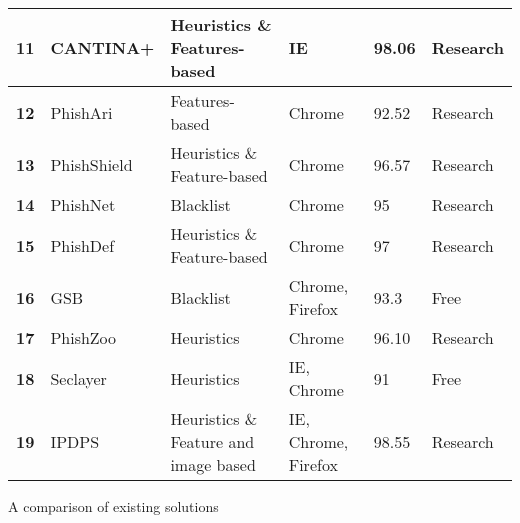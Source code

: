 \begin{center}
\begin{tabular}{ | m{0.9em} | m{7.6em} | m{13em} | m{7.1em} | m{2.3em} | m{4.3em} | }
		\hline
		\multicolumn{1}{|c|}{\textbf{11}} & CANTINA+                     & Heuristics \& Features-based          & IE                  & 98.06           & Research               \\
		\hline
		\multicolumn{1}{|c|}{\textbf{12}} & PhishAri                     & Features-based                        & Chrome              & 92.52           & Research               \\
		\hline
		\multicolumn{1}{|c|}{\textbf{13}} & PhishShield                  & Heuristics \& Feature-based           & Chrome              & 96.57           & Research               \\
		\hline
		\multicolumn{1}{|c|}{\textbf{14}} & PhishNet                     & Blacklist                             & Chrome              & 95              & Research               \\
		\hline
		\multicolumn{1}{|c|}{\textbf{15}} & PhishDef                     & Heuristics \& Feature-based           & Chrome              & 97              & Research               \\
		\hline
		\multicolumn{1}{|c|}{\textbf{16}} & GSB                          & Blacklist                             & Chrome, Firefox     & 93.3            & Free                   \\
		\hline
		\multicolumn{1}{|c|}{\textbf{17}} & PhishZoo                     & Heuristics                            & Chrome              & 96.10           & Research               \\
		\hline
		\multicolumn{1}{|c|}{\textbf{18}} & Seclayer                     & Heuristics                            & IE, Chrome          & 91              & Free                   \\
		\hline
		\multicolumn{1}{|c|}{\textbf{19}} & IPDPS                        & Heuristics \& Feature and image based & IE, Chrome, Firefox & 98.55           & Research               \\
		\hline
	\end{tabular}
	\captionsetup{type=table}\caption{A comparison of existing solutions \citep{INTELLIGENT_PHISHING_ANFIS}}
\end{center}

